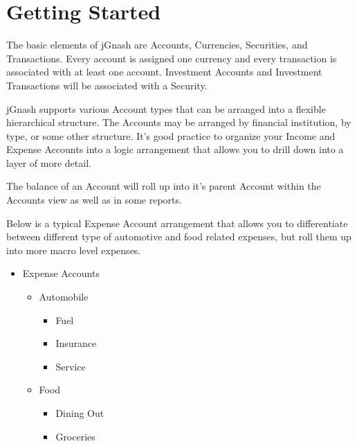 \documentclass[letterpaper,12pt]{book}
\begin{document}
    \chapter{Getting Started}\label{ch:getting-started}
    The basic elements of jGnash are Accounts, Currencies, Securities, and Transactions.
    Every account is assigned one currency and every transaction is associated with at least one account.
    Investment Accounts and Investment Transactions will be associated with a Security.

    jGnash supports various Account types that can be arranged into a flexible hierarchical structure.
    The Accounts may be arranged by financial institution, by type, or some other structure.
    It's good practice to organize your Income and Expense Accounts into a logic arrangement that allows you to drill
    down into a layer of more detail.

    The balance of an Account will roll up into it's parent Account within the Accounts view as well as in some reports.

    Below is a typical Expense Account arrangement that allows you to differentiate between different type of automotive
    and food related expenses, but roll them up into more macro level expenses.

    \begin{mdframed}[style=info]
        \begin{itemize}
            \item Expense Accounts
            \begin{itemize}
                \item Automobile
                \begin{itemize}
                    \item Fuel
                    \item Insurance
                    \item Service
                \end{itemize}
                \item Food
                \begin{itemize}
                    \item Dining Out
                    \item Groceries
                \end{itemize}
            \end{itemize}
        \end{itemize}
    \end{mdframed}
\end{document}
